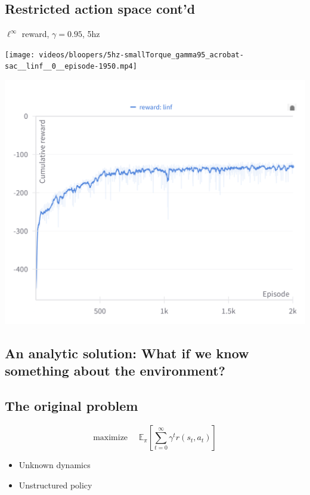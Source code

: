 \documentclass[
  letterpaper,
  DIV=11,
  numbers=noendperiod,
  oneside]{scrartcl}
\providecommand{\tightlist}{%
  \setlength{\itemsep}{0pt}\setlength{\parskip}{0pt}}\usepackage{longtable,booktabs,array}
\begin{document}
\subsection{Restricted action space
cont'd}\label{restricted-action-space-contd}

\(\ell^\infty\) reward, \(\gamma = 0.95\), 5hz

\texttt{[image: videos/bloopers/5hz-smallTorque\_gamma95\_acrobat-sac\_\_linf\_\_0\_\_episode-1950.mp4]}

\includegraphics[width=1\textwidth,height=\textheight]{figs/reward_blooper_linf_gamma_95.png}

\subsection{An analytic solution: What if we know something about the
environment?}\label{an-analytic-solution-what-if-we-know-something-about-the-environment}

\subsection{The original problem}\label{the-original-problem}

\[\text{maximize }\quad \mathbb{E}_{\pi} \left[ \sum_{t=0}^{\infty} \gamma^t r(s_t,a_t)  \right]\]

\begin{itemize}
\tightlist
\item
  Unknown dynamics
\item
  Unstructured policy
\end{itemize}
\end{document}
